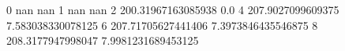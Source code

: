 0 nan nan
1 nan nan
2 200.31967163085938 0.0
4 207.9027099609375 7.583038330078125
6 207.71705627441406 7.3973846435546875
8 208.3177947998047 7.9981231689453125
